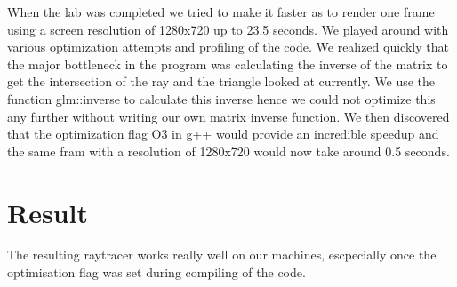 \documentclass[a4]{article}
\begin{document}
When the lab was completed we tried to make it faster as to render one frame
using a screen resolution of 1280x720 up to 23.5 seconds. We played around with
various optimization attempts and profiling of the code. We realized quickly
that the major bottleneck in the program was calculating the inverse of the
matrix to get the intersection of the ray and the triangle looked at currently.
We use the function glm::inverse to calculate this inverse hence we could not
optimize this any further without writing our own matrix inverse function. We
then discovered that the optimization flag O3 in g++ would provide an incredible
speedup and the same fram with a resolution of 1280x720 would now take around 0.5
seconds.

\section{Result}
The resulting raytracer works really well on our machines, escpecially once the
optimisation flag was set during compiling of the code. 
\end{document}

